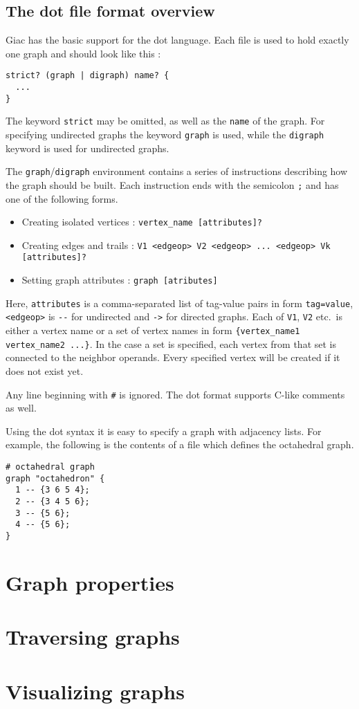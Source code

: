 \documentclass[a4paper,11pt]{article}
\begin{document}
\subsection{The {\sf dot} file format overview}\label{sec:dotformat}

Giac has the basic support for the {\sf dot} language. Each file is used to hold exactly one graph and should look like this :
\begin{verbatim}
strict? (graph | digraph) name? {
  ...
}
\end{verbatim}
The keyword {\tt strict} may be omitted, as well as the {\tt name} of the graph. For specifying undirected graphs the keyword {\tt graph} is used, while the {\tt digraph} keyword is used for undirected graphs.

The {\tt graph}/{\tt digraph} environment contains a series of instructions describing how the graph should be built. Each instruction ends with the semicolon {\tt ;} and has one of the following forms.
\begin{itemize}
  \item Creating isolated vertices : {\tt vertex\_name [attributes]?}
  \item Creating edges and trails : {\tt V1 <edgeop> V2 <edgeop> ... <edgeop> Vk [attributes]?}
  \item Setting graph attributes : {\tt graph [atributes]}
\end{itemize}

Here, {\tt attributes} is a comma-separated list of tag-value pairs in form {\tt tag=value}, {\tt <edgeop>} is \verb|--| for undirected and {\tt ->} for directed graphs. Each of {\tt V1}, {\tt V2} etc.~is either a vertex name or a set of vertex names in form {\tt \{vertex\_name1 vertex\_name2 ...\}}. In the case a set is specified, each vertex from that set is connected to the neighbor operands. Every specified vertex will be created if it does not exist yet.

Any line beginning with {\tt \#} is ignored. The {\sf dot} format supports C-like comments as well.

Using the {\sf dot} syntax it is easy to specify a graph with adjacency lists. For example, the following is the contents of a file which defines the octahedral graph.
\begin{verbatim}
# octahedral graph
graph "octahedron" {
  1 -- {3 6 5 4};
  2 -- {3 4 5 6};
  3 -- {5 6};
  4 -- {5 6};
}
\end{verbatim}

\section{Graph properties}

\section{Traversing graphs}

\section{Visualizing graphs}
\end{document}
